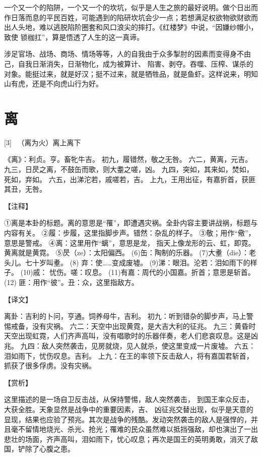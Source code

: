 \documentclass[12pt,UTF8]{ctexbook}
\begin{document}
一个又一个的陷阱，一个又一个的坎坑，似乎是人生之旅的最好说明。做个日出而作日落而息的平民百姓，可能遇到的陷研坎坑会少一点；若想满足权欲物欲财欲而出人头地，难以逃脱陷阶圈套和风口浪尖的摔打。《红楼梦》中说，“因嫌纱帽小，致使 锁枷扛”，算是悟透了人生的这一真谛。

涉足官场、战场、商场、情场等等，人的自我由于众多掣肘的因素而变得身不由己，自我日渐消失，日渐物化，成为被算计、 陷害、剥夺。吞噬、压榨、谋杀的对象。能挺过来，就是好汉；挺不过来，就是牺牲品，就是鱼虾。这样说来，明知山有虎，还是不向虎山行为好。

\chapter{离}

[3] \ （离为火）离上离下

《离》：利贞。亨。畜牝牛吉。
初九，履错然，敬之无咎。
六二，黄离，元吉。
九三，日昃之离，不鼓缶而歌，则大耋之嗟，凶。
九四，突如，其来如，焚如，死如，弃如。
六五，出涕沱若，戚嗟若，吉。
上九，王用出征，有嘉折首，获匪其丑，无咎。

【注释】

①离是本卦的标题。离的意思是“罹”，即遭遇灾祸。全卦内容主要讲战祸，标题与内容有关。
②履：步履，这里指脚步声。错然：杂乱的样子。
③敬；用作“儆”，意思是警戒。
④离：这里用作“螭”，意思是龙， 指天上像龙形的云、虹，即霓。黄离就是黄霓。
⑤昃（ze）：太阳偏西。
(6)缶：陶制的乐器。
(7)大耊（die）：老头儿。七十岁叫耊。
(8) 弃：使……变成废墟。
(9)涕：眼泪。沦若：泪如雨下的样子。
(10)戚： 忧伤。嗟：叹息。
(11)有嘉：周代的小国嘉。折首；意思是斩首。
(12) 匪：用作“彼”。丑：众，这里指敌方。

【译文】

离卦：吉利的卜问，亨通。饲养母牛，吉利。
初九：听到错杂的脚步声，马上警惕戒备，没有灾祸。
六二：天空中出现黄霓，是大吉大利的征兆。
九三：黄昏时天空出现虹霓，人们齐声高叫，没有唱歌时的乐器伴奏，老人们悲哀叹息。这是凶兆。
九四：敌人突然袭击，见房就烧，见人就杀，使这里变成一片废墟。
六五：泪如雨下，忧伤叹息。吉利。
上九：在王的率领下反击敌人，将有嘉国君斩首，抓获了很多俘虏。没有灾祸。

【赏析】

这里描述的是一场自卫反击战，从保持警惕，敌人突然袭击， 到国王率众反击，大获全胜。天象显然是战争中的重要因素，吉、 凶征兆交替出现，似乎是天意的显现，结果也应验了预兆。其次是战争的残酷。发动突然袭击的敌人是强悍的，并且毫不留情地烧光、杀光、抢光；罹难的民众虽然难以抵挡强敌，却也演出了一出悲壮的场面，齐声高叫，泪如雨下，忧心叹息；再次是国王的英明勇敢，消灭了敌国，铲除了心腹之患。
\end{document}

